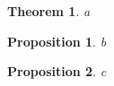 \documentclass{tac}
\begin{document}
\newtheorem{thm}{Theorem}
\begin{thm}a\end{thm}
\newtheorem{thm}{Proposition}
\begin{thm}b\end{thm}
\begin{thm}c\end{thm}
\end{document}
